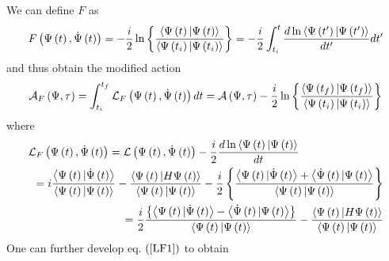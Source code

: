 \documentclass[aps,preprint]{revtex4}
\begin{document}
We can define $F$ as 
\begin{equation}
F\left( \Psi\left( t\right) ,\dot{\Psi}\left( t\right) \right) =-\frac{i}{2}%
\ln\left\{ \frac{\left\langle \Psi\left( t\right) |\Psi\left( t\right)
\right\rangle }{\left\langle \Psi\left( t_{i}\right) |\Psi\left(
t_{i}\right) \right\rangle }\right\} =-\frac{i}{2}\int_{t_{i}}^{t}\frac {%
d\ln\left\langle \Psi\left( t^{\prime}\right) |\Psi\left( t^{\prime }\right)
\right\rangle }{dt^{\prime}}dt^{\prime}
\end{equation}
and thus obtain the modified action 
\begin{equation}
\mathcal{A}_{F}\left( \Psi,\tau\right) =\int_{t_{i}}^{t_{f}}\mathcal{L}%
_{F}\left( \Psi\left( t\right) ,\dot{\Psi}\left( t\right) \right) dt=%
\mathcal{A}\left( \Psi,\tau\right) -\frac{i}{2}\ln\left\{ \frac {%
\left\langle \Psi\left( t_{f}\right) |\Psi\left( t_{f}\right) \right\rangle 
}{\left\langle \Psi\left( t_{i}\right) |\Psi\left( t_{i}\right)
\right\rangle }\right\}  \label{AF}
\end{equation}
where 
\begin{align}
& \mathcal{L}_{F}\left( \Psi\left( t\right) ,\dot{\Psi}\left( t\right)
\right) =\mathcal{L}\left( \Psi\left( t\right) ,\dot{\Psi}\left( t\right)
\right) -\frac{i}{2}\frac{d\ln\left\langle \Psi\left( t\right) |\Psi\left(
t\right) \right\rangle }{dt}  \notag \\
& \left. {}\right. =i\frac{\left\langle \Psi\left( t\right) |\dot{\Psi }%
\left( t\right) \right\rangle }{\left\langle \Psi\left( t\right) |\Psi\left(
t\right) \right\rangle }-\frac{\left\langle \Psi\left( t\right) |H\Psi\left(
t\right) \right\rangle }{\left\langle \Psi\left( t\right) |\Psi\left(
t\right) \right\rangle }-\frac{i}{2}\left\{ \frac{\left\langle \Psi\left(
t\right) |\dot{\Psi}\left( t\right) \right\rangle +\left\langle \dot{\Psi}%
\left( t\right) |\Psi\left( t\right) \right\rangle }{\left\langle \Psi\left(
t\right) |\Psi\left( t\right) \right\rangle }\right\}  \notag \\
& \left. {}\right. \qquad\qquad\qquad\qquad=\frac{i}{2}\frac{\left\{
\left\langle \Psi\left( t\right) |\dot{\Psi}\left( t\right) \right\rangle
-\left\langle \dot{\Psi}\left( t\right) |\Psi\left( t\right) \right\rangle
\right\} }{\left\langle \Psi\left( t\right) |\Psi\left( t\right)
\right\rangle }-\frac{\left\langle \Psi\left( t\right) |H\Psi\left( t\right)
\right\rangle }{\left\langle \Psi\left( t\right) |\Psi\left( t\right)
\right\rangle }  \label{LF1}
\end{align}
One can further develop eq. $\left( \ref{LF1}\right) $ to obtain 
\end{document}
